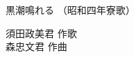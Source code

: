 \documentclass[10pt,b5j]{tarticle} %
\begin{document}
\begin{minipage}[c]{0.7\hsize} %
    \begin{center}
        {\LARGE
            黒潮鳴れる %
        }
        {\small 
            （昭和四年寮歌） %
        }
    \end{center}
\end{minipage}
\begin{minipage}[c]{0.3\hsize} %
    \begin{flushright} %
        須田政美君 作歌\\森忠文君 作曲 %
    \end{flushright}
\end{minipage}
\end{document}
